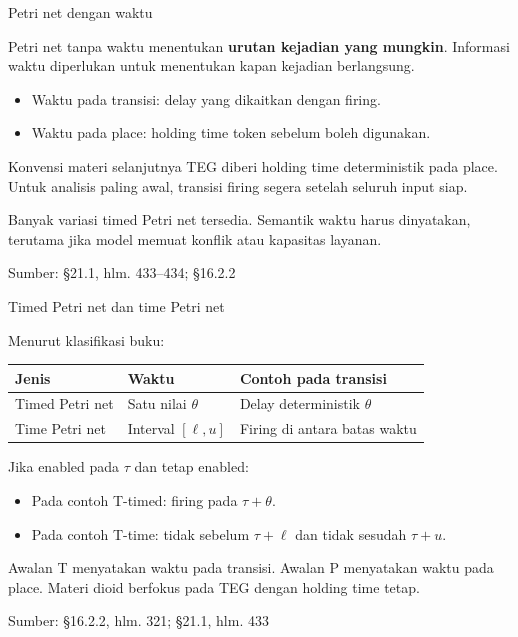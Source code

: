 \documentclass[aspectratio=169,11pt]{beamer}
\newcommand{\source}[1]{%
    \vfill
    \hfill{\tiny\color{gray}Sumber: #1}
}
\begin{document}
\begin{frame}{Petri net dengan waktu}

Petri net tanpa waktu menentukan \textbf{urutan kejadian yang mungkin}.
Informasi waktu diperlukan untuk menentukan kapan kejadian berlangsung.
\begin{itemize}
\item Waktu pada transisi: delay yang dikaitkan dengan firing.
\item Waktu pada place: holding time token sebelum boleh digunakan.
\end{itemize}
\begin{block}{Konvensi materi selanjutnya}
TEG diberi holding time deterministik pada place.
Untuk analisis paling awal, transisi firing segera setelah seluruh input siap.
\end{block}
Banyak variasi timed Petri net tersedia. Semantik waktu harus dinyatakan,
terutama jika model memuat konflik atau kapasitas layanan.

\source{\S21.1, hlm. 433--434; \S16.2.2}
\end{frame}
\begin{frame}{Timed Petri net dan time Petri net}

Menurut klasifikasi buku:
\begin{center}\begin{tabular}{lll}\toprule
Jenis&Waktu&Contoh pada transisi\\\midrule
Timed Petri net&Satu nilai $\theta$&Delay deterministik $\theta$\\
Time Petri net&Interval $[\ell,u]$&Firing di antara batas waktu\\\bottomrule
\end{tabular}\end{center}
Jika enabled pada $\tau$ dan tetap enabled:
\begin{itemize}
\item Pada contoh T-timed: firing pada $\tau+\theta$.
\item Pada contoh T-time: tidak sebelum $\tau+\ell$ dan tidak sesudah $\tau+u$.
\end{itemize}
Awalan T menyatakan waktu pada transisi. Awalan P menyatakan waktu pada place.
Materi dioid berfokus pada TEG dengan holding time tetap.

\source{\S16.2.2, hlm. 321; \S21.1, hlm. 433}
\end{frame}
\end{document}
